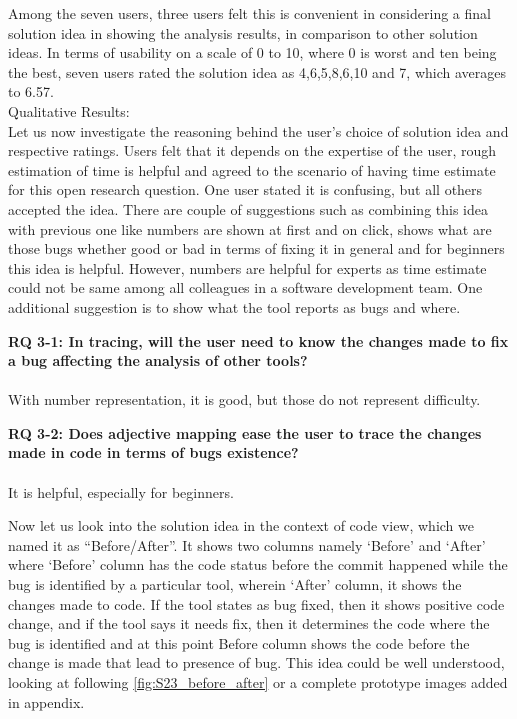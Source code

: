 Among the seven users, three users felt this is convenient in considering a final solution idea in showing the analysis results, in comparison to other solution ideas. In terms of usability on a scale of 0 to 10, where 0 is worst and ten being the best, seven users rated the solution idea as 4,6,5,8,6,10 and 7, which averages to 6.57. \\

Qualitative Results: \\

Let us now investigate the reasoning behind the user’s choice of solution idea and respective ratings. Users felt that it depends on the expertise of the user, rough estimation of time is helpful and agreed to the scenario of having time estimate for this open research question. One user stated it is confusing, but all others accepted the idea. There are couple of suggestions such as combining this idea with previous one like numbers are shown at first and on click, shows what are those bugs whether good or bad in terms of fixing it in general and for beginners this idea is helpful. However, numbers are helpful for experts as time estimate could not be same among all colleagues in a software development team. One additional suggestion is to show what the tool reports as bugs and where. \\

\begin{myboxi}{{\textbf{RQ 3-1: In tracing, will the user need to know the changes made to fix a bug affecting the analysis of other tools?}}}
\\ \\ With number representation, it is good, but those do not represent difficulty.
\end{myboxi}

\begin{myboxi} {{\textbf{RQ 3-2: Does adjective mapping ease the user to trace the changes made in code in terms of bugs existence?}}}
\\ \\ It is helpful, especially for beginners.
\end{myboxi}
	
Now let us look into the solution idea in the context of code view, which we named it as “Before/After”. It shows two columns namely ‘Before’ and ‘After’ where ‘Before’ column has the code status before the commit happened while the bug is identified by a particular tool, wherein ‘After’ column, it shows the changes made to code. If the tool states as bug fixed, then it shows positive code change, and if the tool says it needs fix, then it determines the code where the bug is identified and at this point Before column shows the code before the change is made that lead to presence of bug. This idea could be well understood, looking at following \autoref{fig:S23_before_after} or a complete prototype images added in appendix. \\ \\


